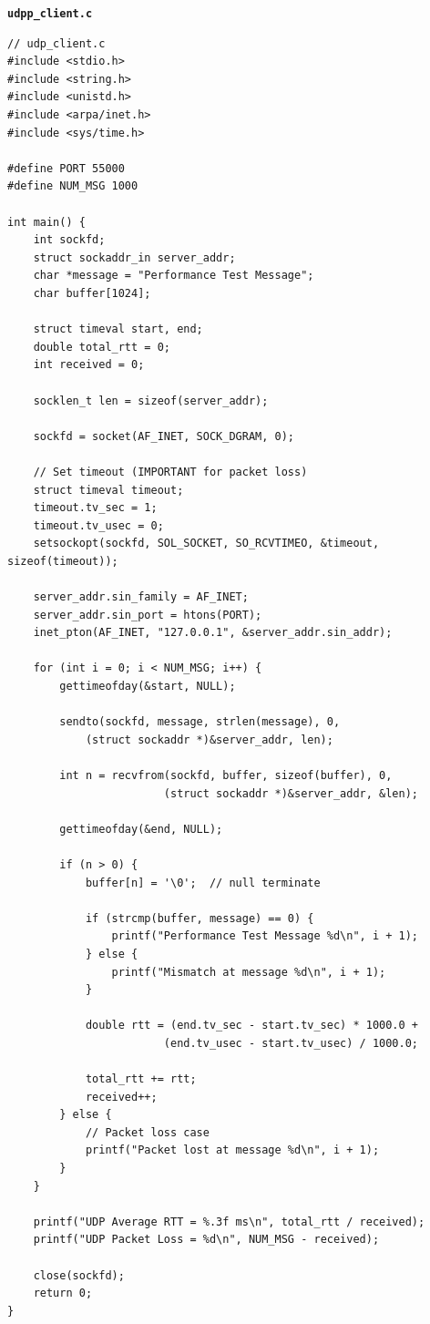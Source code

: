 \documentclass[a4paper,12pt]{article}
\begin{document}
\noindent
\textbf{\texttt{udpp\_client.c}}
\begin{lstlisting}
// udp_client.c
#include <stdio.h>
#include <string.h>
#include <unistd.h>
#include <arpa/inet.h>
#include <sys/time.h>

#define PORT 55000
#define NUM_MSG 1000

int main() {
    int sockfd;
    struct sockaddr_in server_addr;
    char *message = "Performance Test Message";
    char buffer[1024];

    struct timeval start, end;
    double total_rtt = 0;
    int received = 0;

    socklen_t len = sizeof(server_addr);

    sockfd = socket(AF_INET, SOCK_DGRAM, 0);

    // Set timeout (IMPORTANT for packet loss)
    struct timeval timeout;
    timeout.tv_sec = 1;
    timeout.tv_usec = 0;
    setsockopt(sockfd, SOL_SOCKET, SO_RCVTIMEO, &timeout, sizeof(timeout));

    server_addr.sin_family = AF_INET;
    server_addr.sin_port = htons(PORT);
    inet_pton(AF_INET, "127.0.0.1", &server_addr.sin_addr);

    for (int i = 0; i < NUM_MSG; i++) {
        gettimeofday(&start, NULL);

        sendto(sockfd, message, strlen(message), 0,
            (struct sockaddr *)&server_addr, len);

        int n = recvfrom(sockfd, buffer, sizeof(buffer), 0,
                        (struct sockaddr *)&server_addr, &len);

        gettimeofday(&end, NULL);

        if (n > 0) {
            buffer[n] = '\0';  // null terminate

            if (strcmp(buffer, message) == 0) {
                printf("Performance Test Message %d\n", i + 1);
            } else {
                printf("Mismatch at message %d\n", i + 1);
            }

            double rtt = (end.tv_sec - start.tv_sec) * 1000.0 +
                        (end.tv_usec - start.tv_usec) / 1000.0;

            total_rtt += rtt;
            received++;
        } else {
            // Packet loss case
            printf("Packet lost at message %d\n", i + 1);
        }   
    }

    printf("UDP Average RTT = %.3f ms\n", total_rtt / received);
    printf("UDP Packet Loss = %d\n", NUM_MSG - received);

    close(sockfd);
    return 0;
}
\end{lstlisting}
\end{document}
